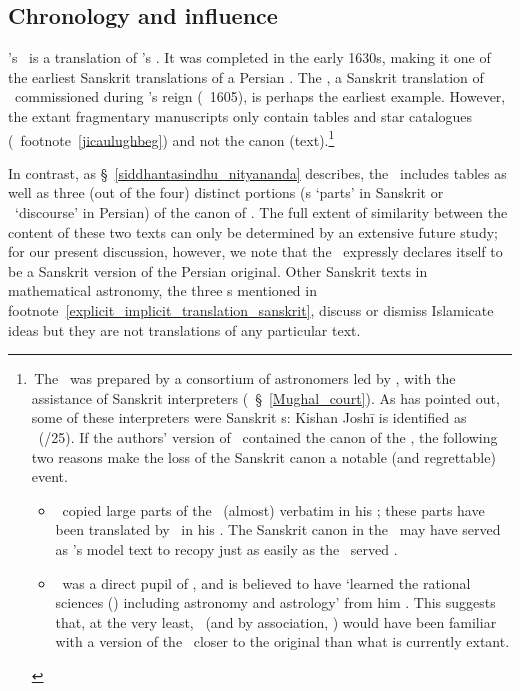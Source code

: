 \subsection{Chronology and influence}\label{chronology_influence}

\Nityananda's \Siddhantasindhu\ is a translation of \MullaFarid's \ZijiShahJahani. It was completed in the early 1630s, making it one of the earliest Sanskrit translations of a Persian \zij. The \JicaUlugbegi, a Sanskrit translation of \ZijUlughBeg\ commissioned during \Akbar's reign (\ante\ 1605), is perhaps the earliest example. However, the extant fragmentary manuscripts only contain tables and star catalogues (\vid\ footnote~\ref{jicaulughbeg}) and not the canon (text).\footnote{\,The \JicaUlugbegi\ was prepared by a consortium of astronomers led by \AmirFathullahofShiraz, with the assistance of Sanskrit interpreters (\vid\  \S~\ref{Mughal_court}). As \textcite[367]{Sarmajyotisaraja} has pointed out, some of these interpreters were Sanskrit \jyotisa s: \eg Kishan Joshī is identified as  \Krsnadaivajna\ (\fl {}/25). If the authors' version of \JicaUlugbegi\ contained the canon of the \ZijUlughBeg, the following two reasons make the loss of the Sanskrit canon a notable (and regrettable) event.
\begin{itemize}
    \item \MullaFarid\ copied large parts of the \ZijUlughBeg\ (almost) verbatim in his \ZijiShahJahani; these parts have been translated by \Nityananda\ in his \Siddhantasindhu. The Sanskrit canon in the \JicaUlugbegi\ may have served as \Nityananda's model text to recopy just as easily as the \ZijUlughBeg\ served \MullaFarid.
    \item \MullaFarid\ was a direct pupil of \AmirFathullahofShiraz, and is believed to have `learned the rational sciences (\UlumiAqliyah) including astronomy and astrology' from him \parencite[720]{Ansarimedievalindia}. This suggests that, at the very least, \MullaFarid\ (and by association, \Nityananda) would have been familiar with a version of the \JicaUlugbegi\ closer to the original than what is currently extant.
\end{itemize}} %

In contrast, as \S~\ref{siddhantasindhu_nityananda} describes, the \Siddhantasindhu\ includes tables as well as three (out of the four) distinct portions (\kanda s `parts' in Sanskrit or \maqalat\ `discourse' in Persian) of the canon of \ZijiShahJahani. The full extent of similarity between the content of these two texts can only be determined by an extensive future study; for our present discussion, however, we note that the \Siddhantasindhu\ expressly declares itself to be a Sanskrit version of the Persian original. Other Sanskrit texts in mathematical astronomy, \eg the three \siddhanta s mentioned in footnote~\ref{explicit_implicit_translation_sanskrit}, discuss or dismiss Islamicate ideas but they are not translations of any particular text. 

